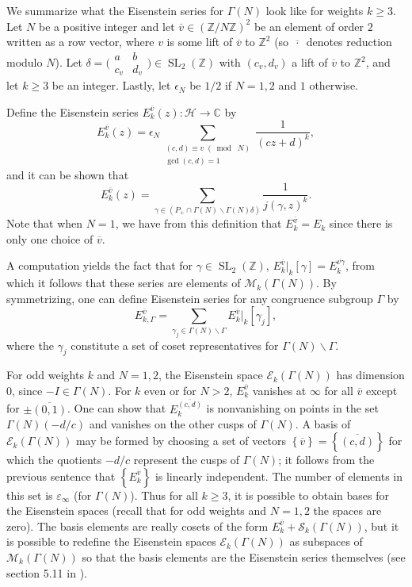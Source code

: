 \documentclass[10pt,leqno,twoside]{article}
\theoremstyle{plain}
\theoremstyle{definition}
\numberwithin{equation}{section}
\numberwithin{lem}{section}
\newcommand{\cbr}[1]{\left\{#1\right\}}
\DeclareMathOperator{\SL}{SL}
\newcommand{\smod}[1]{\;(\bmod\; #1)}
\newcommand{\slz}{\SL_2(\mathbb{Z})}
\begin{document}
We summarize what the Eisenstein series for $\varGamma(N)$ look like for weights $k\geq 3$. Let $N$ be a positive integer and let $\overline v \in (\mathbb Z/N\mathbb Z)^2$ be an element of order $2$ written as a row vector, where $v$ is some lift of $\overline v$ to $\mathbb Z^2$ (so $\overline{\,\cdot\,}$ denotes reduction modulo $N$). Let $\delta = \big(\!\begin{smallmatrix}
    a & b \\ c_v & d_v
\end{smallmatrix}\!\big)\in\slz$ with $(c_v,d_v)$ a lift of $\overline v$ to $\mathbb Z^2$, and let $k\geq 3$ be an integer. Lastly, let $\epsilon_N$ be $1/2$ if $N=1,2$ and $1$ otherwise. 

Define the Eisenstein series $E_k^{\overline v}(z)\colon\mathcal H\to\mathbb C$ by \[E_k^{\overline v}(z) =\epsilon_N\sum_{\substack{(c,d)\equiv v\smod N\\\gcd(c,d) = 1}}\frac{1}{(cz+d)^k},\] and it can be shown that \[E_k^{\overline v}(z) = \sum_{\gamma \in(P_+\cap \varGamma(N)\backslash \varGamma(N)\delta)}\frac{1}{j(\gamma,z)^k}.\] Note that when $N = 1$, we have from this definition that $E_k^{\overline v} = E_k$ since there is only one choice of $\overline v$.

A computation yields the fact that for $\gamma\in\slz$, $E_k^{\overline v}|_k[\gamma] = E_k^{\overline{v\gamma}}$, from which it follows that these series are elements of $\mathcal M_k(\varGamma(N))$. By symmetrizing, one can define Eisenstein series for any congruence subgroup $\varGamma$ by
\[E_{k,\varGamma}^{\overline v} = \sum_{\gamma_j\in\varGamma(N)\backslash \varGamma}E_k^{\overline v}|_k[\gamma_j],\] where the $\gamma_j$ constitute a set of coset representatives for $\varGamma(N)\backslash \varGamma$.

For odd weights $k$ and $N = 1,2$, the Eisenstein space $\mathcal E_k(\varGamma(N))$ has dimension $0$, since $-I\in\varGamma(N)$. For $k$ even or for $N>2$, $E_k^{\overline v}$ vanishes at $\infty$ for all $\overline v$ except for $\pm\overline{(0,1)}$. One can show that $E_k^{\overline{(c,d)}}$ is nonvanishing on points in the set $\varGamma(N)(-d/c)$ and vanishes on the other cusps of $\varGamma(N)$. A basis of $\mathcal E_k(\varGamma(N))$ may be formed by choosing a set of vectors $\cbr{\overline v} = \cbr{\overline{(c,d)}}$ for which the quotients $-d/c$ represent the cusps of $\varGamma(N)$; it follows from the previous sentence that $\cbr{E_k^{\overline v}}$ is linearly independent. The number of elements in this set is $\varepsilon_\infty$ (for $\varGamma(N)$). Thus for all $k\geq 3$, it is possible to obtain bases for the Eisenstein spaces (recall that for odd weights and $N = 1,2$ the spaces are zero). The basis elements are really cosets of the form $E_k^{\overline v} + \mathcal S_k(\varGamma(N))$, but it is possible to redefine the Eisenstein spaces $\mathcal E_k(\varGamma(N))$ as subspaces of $\mathcal M_k(\varGamma(N))$ so that the basis elements are the Eisenstein series themselves (see section 5.11 in \cite{diamond}).
\end{document}
